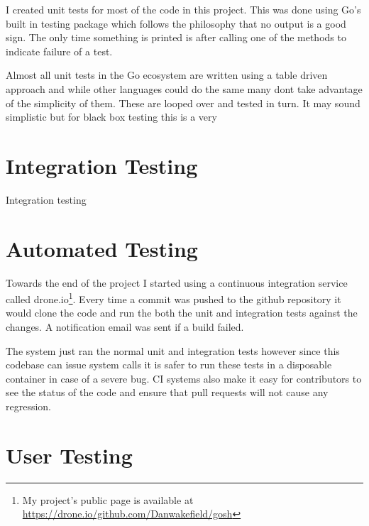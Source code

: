I created unit tests for most of the code in this project.
This was done using Go's built in testing package which follows the philosophy that no output is a good sign. 
The only time something is printed is after calling one of the methods to indicate failure of a test.

Almost all unit tests in the Go ecosystem are written using a table driven approach and while other languages could do the same many dont take advantage of the simplicity of them.
These are looped over and tested in turn.
It may sound simplistic but for black box testing this is a very 

\section{Integration Testing}
Integration testing 

\section{Automated Testing}
Towards the end of the project I started using a continuous integration service called drone.io\footnote{My project's public page is available at \url{https://drone.io/github.com/Danwakefield/gosh}}.
Every time a commit was pushed to the github repository it would clone the code and run the both the unit and integration tests against the changes.
A notification email was sent if a build failed.

The system just ran the normal unit and integration tests however since this codebase can issue system calls it is safer to run these tests in a disposable container in case of a severe bug.  
CI systems also make it easy for contributors to see the status of the code and ensure that pull requests will not cause any regression.

\section{User Testing}
















